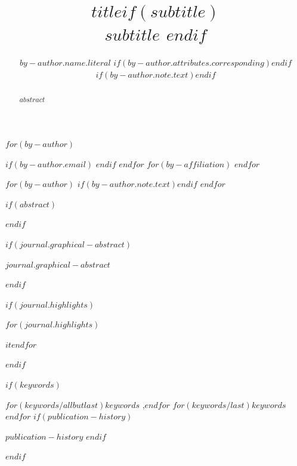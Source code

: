 

\let\pomOriginalMaketitleBox\MaketitleBox
\renewcommand{\MaketitleBox}{%
  \resetTitleCounters
  \begingroup
    \def\baselinestretch{1}%
    \setlength{\parskip}{0pt}%
    \ifvoid\absbox\else\unvbox\absbox\par\vskip10pt\fi
    \ifvoid\keybox\else\unvbox\keybox\par\fi
  \endgroup
}

\begin{frontmatter}
\title{$title$$if(subtitle)$ \\\large{$subtitle$} $endif$}
$for(by-author)$\author[$for(by-author.affiliations)$$it.number$$sep$,$endfor$]{$by-author.name.literal$%
$if(by-author.attributes.corresponding)$$endif$%
$if(by-author.note.text)$$endif$}
$if(by-author.email)$  $endif$
$endfor$
$for(by-affiliation)$
$endfor$

$for(by-author)$
$if(by-author.note.text)$$endif$
$endfor$
        
$if(abstract)$
\begin{abstract}
$abstract$
\end{abstract}
$endif$

$if(journal.graphical-abstract)$\begin{graphicalabstract}
$journal.graphical-abstract$
\end{graphicalabstract}
$endif$

$if(journal.highlights)$\begin{highlights}
$for(journal.highlights)$\item $it$$endfor$
\end{highlights}
$endif$

$if(keywords)$
\begin{keyword}
    $for(keywords/allbutlast)$$keywords$ \sep $endfor$
    $for(keywords/last)$$keywords$$endfor$
$if(publication-history)$
\par\smallskip
\noindent $publication-history$
$endif$
\end{keyword}
$endif$
\end{frontmatter}
\thispagestyle{plain}
\let\MaketitleBox\pomOriginalMaketitleBox
    